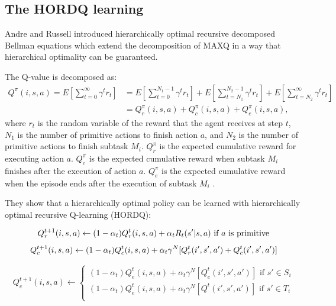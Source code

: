 \subsection{The HORDQ learning}

Andre and Russell \cite{HORDQ} introduced hierarchically optimal recursive decomposed Bellman equations
which extend the decomposition of MAXQ in a way that hierarchical optimality can be guaranteed.

The Q-value is decomposed as:
\begin{align}
    Q^{\pi}(i, s, a) = E[\sum_{t=0}^{\infty}\gamma^t r_t] &= E[\sum_{t=0}^{N_1 - 1}\gamma^t r_t] + E[\sum_{t=N_1}^{N_2 - 1}\gamma^t r_t] + E[\sum_{t=N_2}^{\infty}\gamma^t r_t]\\
                    &= Q_r^{\pi}(i, s, a) + Q_c^{\pi}(i, s, a) + Q_e^{\pi}(i, s, a),
\end{align}
where $r_t$ is the random variable of the reward that the agent receives at step $t$, $N_1$ is the number of primitive actions to finish action $a$, 
and $N_2$ is the number of primitive actions 
to finish subtask $M_i$. $ Q_r^{\pi}$ is the expected cumulative reward for executing action $a$.
$Q_c^{\pi}$ is the expected cumulative reward when subtask $M_i$ finishes after the execution of action $a$. 
$Q_e^{\pi}$ is the expected cumulative reward when the episode ends after the execution of subtask $M_i$ .

They show that a hierarchically optimal policy can be learned with hierarchically optimal recursive Q-learning (HORDQ):

\begin{equation}
    Q_r^{t+1}(i, s, a) \leftarrow
    (1 - \alpha_t)Q_r^t(i, s, a) + \alpha_t R_t(s'| s, a)   \mbox{ if $a$ is primitive} \\
\end{equation}
\begin{equation}
    Q_c^{t+1}(i, s, a) \leftarrow
    (1 - \alpha_t)Q_c^t(i, s, a) + \alpha_t \gamma^N[Q_r^{t}(i', s', a') + Q_c^t(i', s', a')] \\
\end{equation}

\begin{equation}
    Q_e^{t+1}(i, s, a) \leftarrow
    \left\{\begin{array}{ll}
    (1 - \alpha_t)Q_e^{t}(i, s, a) + \alpha_t \gamma^N[Q_e^{t}(i', s', a')]  \mbox{ if $s' \in S_i$} \\
    (1 - \alpha_t)Q_e^{t}(i, s, a) + \alpha_t \gamma^N[Q^{t}(i', s', a')]  \mbox{ if $s' \in T_i$} \\
    \end{array} \right.
\end{equation}

